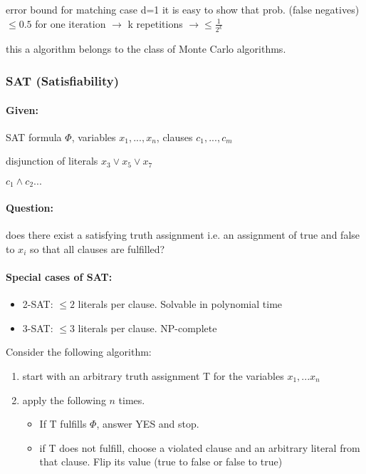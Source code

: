 \documentclass[11pt]{article}
\theoremstyle{definition}
\theoremstyle{definition}
\begin{document}
error bound for matching case d=1
it is easy to show that prob. (false negatives) $\leq 0.5 $ for one iteration $\rightarrow$ k repetitions $\rightarrow \leq \frac{1}{2^k} $

this a algorithm belongs to the class of Monte Carlo algorithms.

\subsubsection{SAT (Satisfiability)}

\paragraph{Given:} SAT formula $\Phi $, variables $ x_1, ..., x_n$, clauses $ c_1, ..., c_m$

disjunction of literals $x_3 \vee x_5 \vee x_7 $

$ c_1 \wedge c_2...$

\paragraph{Question:} does there exist a satisfying truth assignment i.e. an assignment of true and false to $ x_i $ so that all clauses are fulfilled?

\paragraph{Special cases of SAT:}
\begin{itemize}
\item 2-SAT: $\leq 2$ literals per clause. Solvable in polynomial time
\item 3-SAT: $\leq 3$ literals per clause. NP-complete
\end{itemize} \medskip

Consider the following algorithm:
\begin {enumerate}
\item start with an arbitrary truth assignment T for the variables $x_1,... x_n$

\item apply the following $ n $ times.
	\begin{itemize}
	\item If T fulfills $\Phi$, answer YES and stop.
	\item if T does not fulfill, choose a violated clause and an arbitrary literal from that clause. Flip its value (true to false or false to true)
	\end{itemize}
\end {enumerate}
\end{document}
